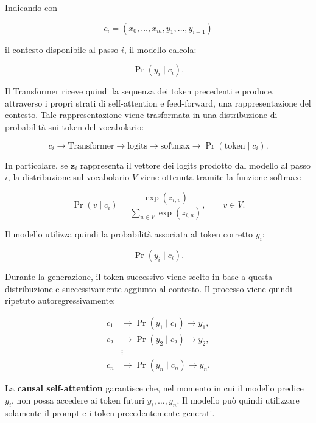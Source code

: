 Indicando con

\[
c_i=(x_0,\ldots,x_m,y_1,\ldots,y_{i-1})
\]

il contesto disponibile al passo $i$, il modello calcola:

\begin{equation}
\Pr(y_i\mid c_i).
\end{equation}

Il Transformer riceve quindi la sequenza dei token precedenti e produce, attraverso i propri strati di self-attention e feed-forward, una rappresentazione del contesto. Tale rappresentazione viene trasformata in una distribuzione di probabilità sui token del vocabolario:

\begin{equation}
c_i
\longrightarrow
\text{Transformer}
\longrightarrow
\text{logits}
\longrightarrow
\text{softmax}
\longrightarrow
\Pr(\text{token}\mid c_i).
\end{equation}

In particolare, se $\mathbf{z}_i$ rappresenta il vettore dei logits prodotto dal modello al passo $i$, la distribuzione sul vocabolario $V$ viene ottenuta tramite la funzione softmax:

\begin{equation}
\Pr(v\mid c_i)
=
\frac{\exp(z_{i,v})}
{\sum_{u\in V}\exp(z_{i,u})},
\qquad v\in V.
\end{equation}

Il modello utilizza quindi la probabilità associata al token corretto $y_i$:

\begin{equation}
\Pr(y_i\mid c_i).
\end{equation}

Durante la generazione, il token successivo viene scelto in base a questa distribuzione e successivamente aggiunto al contesto. Il processo viene quindi ripetuto autoregressivamente:

\begin{align*}
c_1 &\rightarrow \Pr(y_1\mid c_1) \rightarrow y_1,\\
c_2 &\rightarrow \Pr(y_2\mid c_2) \rightarrow y_2,\\
&\vdots\\
c_n &\rightarrow \Pr(y_n\mid c_n) \rightarrow y_n.
\end{align*}

La \textbf{causal self-attention} garantisce che, nel momento in cui il modello predice $y_i$, non possa accedere ai token futuri $y_i,\ldots,y_n$. Il modello può quindi utilizzare solamente il prompt e i token precedentemente generati.


